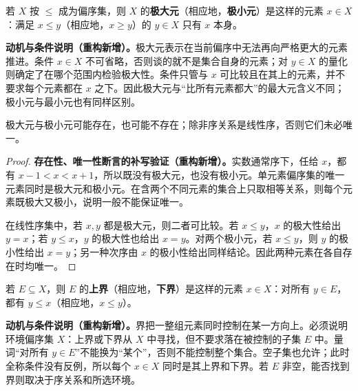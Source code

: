 \documentclass[../../main.tex]{subfiles}%
\begin{document}

\begin{definition}[极大元与极小元]\label{definition:ch00-maximal-bounds}
若 $X$ 按 $\leqslant$ 成为偏序集，则 $X$ 的\textbf{极大元}（相应地，\textbf{极小元}）是这样的元素 $x\in X$：满足 $x\leqslant y$（相应地，$x\geqslant y$）的 $y\in X$ 只有 $x$ 本身。
\end{definition}
\begin{remark}
\textbf{动机与条件说明（重构新增）。}极大元表示在当前偏序中无法再向严格更大的元素推进。条件 $x\in X$ 不可省略，否则谈的就不是集合自身的元素；对 $y\in X$ 的量化则确定了在哪个范围内检验极大性。条件只管与 $x$ 可比较且在其上的元素，并不要求每个元素都在 $x$ 之下。因此极大元与“比所有元素都大”的最大元含义不同；极小元与最小元也有同样区别。
\end{remark}


\begin{remark}
极大元与极小元可能存在，也可能不存在；除非序关系是线性序，否则它们未必唯一。
\end{remark}
\begin{proof}
\textbf{存在性、唯一性断言的补写验证（重构新增）。}实数通常序下，任给 $x$，都有 $x-1<x<x+1$，所以既没有极大元，也没有极小元。单元素偏序集的唯一元素同时是极大元和极小元。在含两个不同元素的集合上只取相等关系，则每个元素既极大又极小，说明一般不能保证唯一。

在线性序集中，若 $x,y$ 都是极大元，则二者可比较。若 $x\leqslant y$，$x$ 的极大性给出 $y=x$；若 $y\leqslant x$，$y$ 的极大性也给出 $x=y$。对两个极小元，若 $x\leqslant y$，则 $y$ 的极小性给出 $x=y$；另一种次序由 $x$ 的极小性给出同样结论。因此两种元素在各自存在时均唯一。
\end{proof}


\begin{definition}[上界与下界]\label{definition:ch00-upper-lower-bounds}
若 $E\subseteq X$，则 $E$ 的\textbf{上界}（相应地，\textbf{下界}）是这样的元素 $x\in X$：对所有 $y\in E$，都有 $y\leqslant x$（相应地，$x\leqslant y$）。
\end{definition}
\begin{remark}
\textbf{动机与条件说明（重构新增）。}界把一整组元素同时控制在某一方向上。必须说明环境偏序集 $X$：上界或下界从 $X$ 中寻找，但不要求落在被控制的子集 $E$ 中。量词“对所有 $y\in E$”不能换为“某个”，否则不能控制整个集合。空子集也允许；此时全称条件没有反例，所以每个 $x\in X$ 同时是其上界和下界。若 $E$ 非空，能否找到界则取决于序关系和所选环境。
\end{remark}
\end{document}
